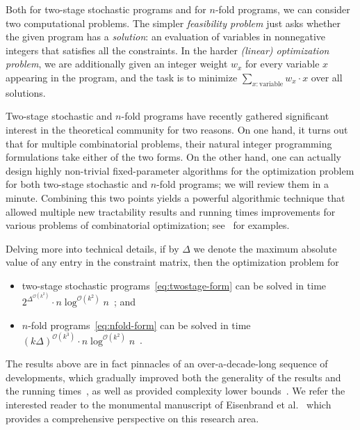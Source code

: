 \documentclass{article}
\newcommand{\Oh}{{\mathcal{O}}}
\begin{document}
Both for two-stage stochastic programs and for $n$-fold programs, we can consider two computational problems. The simpler {\em{feasibility problem}} just asks whether the given program has a {\em{solution}}: an evaluation of variables in nonnegative integers that satisfies all the constraints. In the harder {\em{(linear) optimization problem}}, we are additionally given an integer weight $w_x$ for every variable $x$ appearing in the program, and the task is to minimize $\sum_{x\colon \text{variable}} w_x\cdot x$ over all solutions.

Two-stage stochastic and $n$-fold programs have recently gathered significant interest in the theoretical community for two reasons. On one hand, it turns out that for multiple combinatorial problems, their natural integer programming formulations take either of the two forms. On the other hand, one can actually design highly non-trivial fixed-parameter algorithms for the optimization problem for both two-stage stochastic and $n$-fold programs; we will review them in a minute. Combining this two points yields a powerful algorithmic technique that allowed multiple new tractability results and running times improvements for various problems of combinatorial optimization; see~\cite{ChenMYZ17,GavenciakKK22,JansenKMR22,KnopK18,KnopK22,KnopKLMO21,KnopKM20,KnopKM20b,KouteckyZ20} for examples.

Delving more into technical details, if by $\Delta$ we denote the maximum absolute value of any entry in the constraint matrix, then the optimization problem for
\begin{itemize}[nosep]
    \item two-stage stochastic programs~\cref{eq:twostage-form} can be solved in time \mbox{$2^{\Delta^{\Oh(k^2)}}\cdot n\log^{\Oh(k^2)} n$}~\cite{CslovjecsekEPVW21}; and
    \item $n$-fold programs~\cref{eq:nfold-form} can be solved in time $(k\Delta)^{\Oh(k^3)}\cdot n\log^{\Oh(k^2)} n$~\cite{CslovjecsekEHRW21}.
\end{itemize}
The results above are in fact pinnacles of an over-a-decade-long sequence of developments, which gradually improved both the generality of the results and the running times~\cite{AschenbrennerH07,CslovjecsekEHRW21,CslovjecsekEPVW21,DeLoera2008,EisenbrandHK18,monster,HemmeckeOR13,JansenLR20,DBLP:journals/mp/Klein22,KouteckyLO18}, as well as provided complexity lower bounds~\cite{JansenKL23,KnopPW20}. We refer the interested reader to the monumental manuscript of Eisenbrand et al.~\cite{monster} which provides a comprehensive perspective on this research area.
\end{document}

